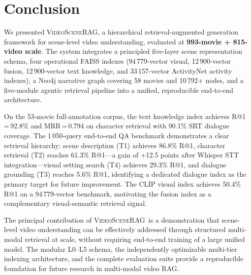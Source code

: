 \documentclass[11pt]{article}
\newcommand{\system}{\textsc{VideoSceneRAG}}
\begin{document}
\section{Conclusion}
\label{sec:conclusion}

We presented \system, a hierarchical retrieval-augmented generation framework
for scene-level video understanding, evaluated at \textbf{993-movie +
815-video scale}.  The system integrates a principled five-layer scene
representation schema, four operational FAISS indexes (94\,779-vector visual,
12\,900-vector fusion, 12\,900-vector text knowledge, and 33\,157-vector
ActivityNet activity indexes), a Neo4j narrative graph covering 58 movies and
10\,792+ nodes, and a five-module agentic retrieval pipeline into a unified,
reproducible end-to-end architecture.

On the 53-movie full-annotation corpus, the text knowledge index achieves
R@1\,=\,92.8\% and MRR\,=\,0.794 on character retrieval with 90.1\% SRT
dialogue coverage.  The 1\,050-query end-to-end QA benchmark demonstrates a
clear retrieval hierarchy: scene description (T1) achieves 86.8\% R@1,
character retrieval (T2) reaches 61.3\% R@1---a gain of +12.5 points after
Whisper STT integration---visual setting search (T4) achieves 29.3\% R@1,
and dialogue grounding (T3) reaches 5.6\% R@1, identifying a dedicated
dialogue index as the primary target for future improvement.  The CLIP visual
index achieves 50.4\% R@1 on a 94\,779-vector benchmark, motivating the
fusion index as a complementary visual-semantic retrieval signal.

The principal contribution of \system\ is a demonstration that scene-level
video understanding can be effectively addressed through structured multi-modal
retrieval at scale, without requiring end-to-end training of a large unified
model.  The modular L0--L5 schema, the independently optimizable multi-tier
indexing architecture, and the complete evaluation suite provide a reproducible
foundation for future research in multi-modal video RAG\@.
\end{document}
